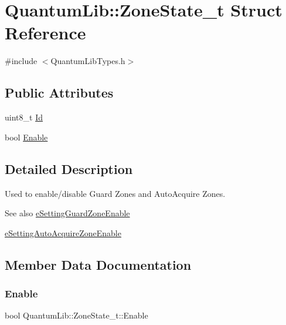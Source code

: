 \hypertarget{struct_quantum_lib_1_1_zone_state__t}{}\section{Quantum\+Lib\+:\+:Zone\+State\+\_\+t Struct Reference}
\label{struct_quantum_lib_1_1_zone_state__t}


{\ttfamily \#include $<$Quantum\+Lib\+Types.\+h$>$}

\subsection*{Public Attributes}
\begin{DoxyCompactItemize}
\item 
uint8\+\_\+t \mbox{\hyperlink{struct_quantum_lib_1_1_zone_state__t_a7ccb0f763c97ad5cc8d1eaeefeef15bc}{Id}}
\item 
bool \mbox{\hyperlink{struct_quantum_lib_1_1_zone_state__t_a1ab337e208c082a96c91cb97c609cd43}{Enable}}
\end{DoxyCompactItemize}


\subsection{Detailed Description}
Used to enable/disable Guard Zones and Auto\+Acquire Zones. \begin{DoxySeeAlso}{See also}
\mbox{\hyperlink{namespace_quantum_lib_acc8124e3e65bca4aa798d03a55e3d54caa5baecb408949642582b8300529a57d6}{e\+Setting\+Guard\+Zone\+Enable}} 

\mbox{\hyperlink{namespace_quantum_lib_acc8124e3e65bca4aa798d03a55e3d54cac2aed9d73c5515b007216538f524dbc4}{e\+Setting\+Auto\+Acquire\+Zone\+Enable}} 
\end{DoxySeeAlso}


\subsection{Member Data Documentation}
\mbox{\label{struct_quantum_lib_1_1_zone_state__t_a1ab337e208c082a96c91cb97c609cd43}} 
\subsubsection{\texorpdfstring{Enable}{Enable}}
{\footnotesize\ttfamily bool Quantum\+Lib\+::\+Zone\+State\+\_\+t\+::\+Enable}

